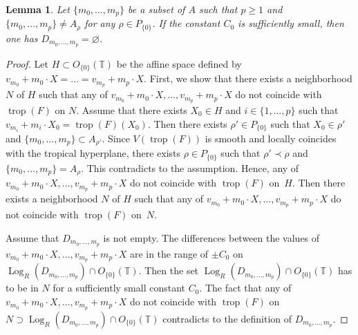 \documentclass[pdftex]{sigma}
\numberwithin{equation}{section}
\newtheorem{Lemma}[Theorem]{Lemma}
\begin{document}
\begin{Lemma}\label{lm:oth}
Let $\{m_0, \dots, m_{p}\}$ be a subset of $A$ such that $p \geq 1$ and $\{m_0, \dots, m_{p}\} \neq A_\rho$ for any $\rho \in P_{\{0\}}$. If the constant $C_0$ is sufficiently small, then one has $D_{m_0, \dots, m_p}=\varnothing$.
\end{Lemma}
\begin{proof}
Let $H \subset O_{\{0\}}({\mathbb T})$ be the af\/f\/ine space def\/ined by \mbox{$v_{m_0}+m_0 \cdot X= \dots =v_{m_p}+m_p \cdot X$}.
First, we show that there exists a neighborhood $N$ of $H$ such that any of $v_{m_0}+m_0 \cdot X, \dots, v_{m_p}+m_p \cdot X$ do not coincide with $\operatorname{trop}(F)$ on $N$. Assume that there exists $X_0 \in H$ and $i \in \{1, \dots, p\}$ such that $v_{m_i}+m_i \cdot X_0 = \operatorname{trop}(F)(X_0)$. Then there exists $\rho' \in P_{\{0\}}$ such that \mbox{$X_0 \in \rho'$} and \mbox{$\{m_0, \dots, m_{p}\} \subset A_{\rho'}$}. Since $V(\operatorname{trop}(F))$ is smooth and locally coincides with the tropical hyperplane, there exists $\rho \in P_{\{0\}}$ such that $\rho' \prec \rho$ and $\{m_0, \dots, m_{p}\} = A_{\rho}$. This contradicts to the assumption. Hence, any of $v_{m_0}+m_0 \cdot X, \dots, v_{m_p}+m_p \cdot X$ do not coincide with $\operatorname{trop}(F)$ on~$H$. Then there exists a neighborhood $N$ of $H$ such that any of $v_{m_0}+m_0 \cdot X, \dots, v_{m_p}+m_p \cdot X$ do not coincide with $\operatorname{trop}(F)$ on~$N$.

Assume that $D_{m_0, \dots, m_p}$ is not empty. The dif\/ferences between the values of $v_{m_0}+m_0 \cdot X, \dots, v_{m_p}+m_p \cdot X$ are in the range of $\pm C_0$ on $\operatorname{Log}_R(D_{m_0, \dots, m_p}) \cap O_{\{0\}}({\mathbb T})$. Then the set $\operatorname{Log}_R(D_{m_0, \dots, m_p}) \cap O_{\{0\}}({\mathbb T})$ has to be in $N$ for a suf\/f\/iciently small constant $C_0$. The fact that any of $v_{m_0}+m_0 \cdot X, \dots, v_{m_p}+m_p \cdot X$ do not coincide with $\operatorname{trop}(F)$ on $N \supset \operatorname{Log}_R(D_{m_0, \dots, m_p}) \cap O_{\{0\}}({\mathbb T})$ contradicts to the def\/inition of $D_{m_0, \dots, m_p}$.
\end{proof}
\end{document}

